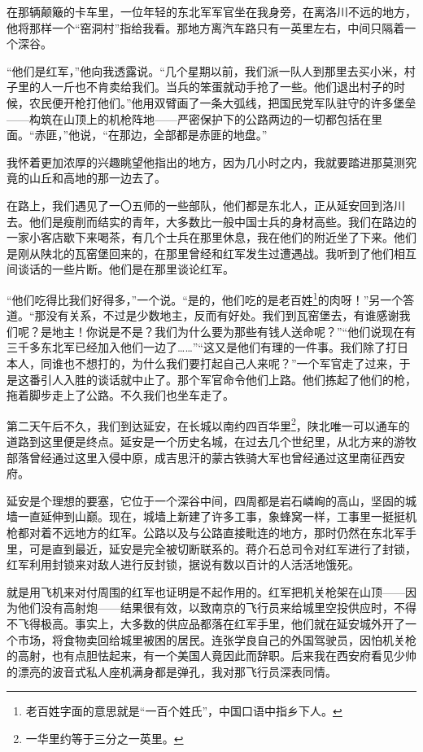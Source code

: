 \documentclass[10pt]{book}
\begin{document}
在那辆颠簸的卡车里，一位年轻的东北军军官坐在我身旁，在离洛川不远的地方，他将那样一个“窑洞村”指给我看。那地方离汽车路只有一英里左右，中间只隔着一个深谷。

“他们是红军，”他向我透露说。“几个星期以前，我们派一队人到那里去买小米，村子里的人一斤也不肯卖给我们。当兵的笨蛋就动手抢了一些。他们退出村子的时候，农民便开枪打他们。”他用双臂画了一条大弧线，把国民党军队驻守的许多堡垒——构筑在山顶上的机枪阵地——严密保护下的公路两边的一切都包括在里面。“赤匪，”他说，“在那边，全部都是赤匪的地盘。”

我怀着更加浓厚的兴趣眺望他指出的地方，因为几小时之内，我就要踏进那莫测究竟的山丘和高地的那一边去了。

在路上，我们遇见了一〇五师的一些部队，他们都是东北人，正从延安回到洛川去。他们是瘦削而结实的青年，大多数比一般中国士兵的身材高些。我们在路边的一家小客店歇下来喝茶，有几个士兵在那里休息，我在他们的附近坐了下来。他们是刚从陕北的瓦窑堡回来的，在那里曾经和红军发生过遭遇战。我听到了他们相互间谈话的一些片断。他们是在那里谈论红军。

“他们吃得比我们好得多，”一个说。“是的，他们吃的是老百姓\footnote{老百姓字面的意思就是“一百个姓氏”，中国口语中指乡下人。}的肉呀！”另一个答道。“那没有关系，不过是少数地主，反而有好处。我们到瓦窑堡去，有谁感谢我们呢？是地主！你说是不是？我们为什么要为那些有钱人送命呢？”“他们说现在有三千多东北军已经加入他们一边了……”“这又是他们有理的一件事。我们除了打日本人，同谁也不想打的，为什么我们要打起自己人来呢？”一个军官走了过来，于是这番引人入胜的谈话就中止了。那个军官命令他们上路。他们拣起了他们的枪，拖着脚步走上了公路。不久我们也坐车走了。

第二天午后不久，我们到达延安，在长城以南约四百华里\footnote{一华里约等于三分之一英里。}，陕北唯一可以通车的道路到这里便是终点。延安是一个历史名城，在过去几个世纪里，从北方来的游牧部落曾经通过这里入侵中原，成吉思汗的蒙古铁骑大军也曾经通过这里南征西安府。

延安是个理想的要塞，它位于一个深谷中间，四周都是岩石嶙峋的高山，坚固的城墙一直延伸到山巅。现在，城墙上新建了许多工事，象蜂窝一样，工事里一挺挺机枪都对着不远地方的红军。公路以及与公路直接毗连的地方，那时仍然在东北军手里，可是直到最近，延安是完全被切断联系的。蒋介石总司令对红军进行了封锁，红军利用封锁来对敌人进行反封锁，据说有数以百计的人活活地饿死。

就是用飞机来对付周围的红军也证明是不起作用的。红军把机关枪架在山顶——因为他们没有高射炮——结果很有效，以致南京的飞行员来给城里空投供应时，不得不飞得极高。事实上，大多数的供应品都落在红军手里，他们就在延安城外开了一个市场，将食物卖回给城里被困的居民。连张学良自己的外国驾驶员，因怕机关枪的高射，也有点胆怯起来，有一个美国人竟因此而辞职。后来我在西安府看见少帅的漂亮的波音式私人座机满身都是弹孔，我对那飞行员深表同情。
\end{document}
